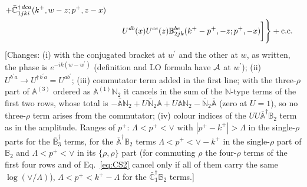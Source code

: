 \documentclass[aps,prd,amsmath,amssymb,nofootinbib]{revtex4-2}
\def\mf#1{\mathbb{#1}}
\numberwithin{equation}{section}
\begin{document}
\begin{align}
           +\bar{\mf{C}}^{\dagger\, dca}_{1jki}(k^+,w-z; p^+, z-x)  \notag \\ &\quad \quad
                 U^{db}(x)
                 U^{ce}(z) 
                {\mf{B}}^{be}_{2jk} (k^{+}-p^+, -z; p^+, -x) \bigg]  \Bigg\}+ {\rm c.c.}
\end{align} {\color{red}[Changes: (i) with the conjugated bracket at $w^\prime$ and the other at $w$, as written, the phase is $e^{-ik(w-w^\prime)}$ (definition and LO formula have ${\cal A}$ at $w^\prime$); (ii) $U^{b^\prime a}\to U^{\dagger\, b^\prime a}=U^{ab^\prime}$; (iii) commutator term added in the first line; with the three-$\rho$ part of $\mf{A}^{(3)}$ ordered as $\mf{A}^{(1)}\mf{N}_2$ it cancels in the sum of the $\mf{N}$-type terms of the first two rows, whose total is $-\bar{\mf{A}}\mf{N}_2+U\bar{\mf{N}}_2\mf{A}+U\mf{A}\mf{N}_2-\bar{\mf{N}}_2\bar{\mf{A}}$ (zero at $U=1$), so no three-$\rho$ term arises from the commutator; (iv) colour indices of the $UU\bar{\mf{A}}^\dagger\mf{B}_2$ term as in the amplitude. Ranges of $p^+$: $\Lambda<p^+<\vee$ with $|p^+-k^+|>\Lambda$ in the single-$\rho$ parts for the $\bar{\mf{B}}_3^\dagger$ terms, for the $\bar{\mf{A}}^\dagger\mf{B}_2$ terms $\Lambda<p^+<\vee-k^+$ in the single-$\rho$ part of $\mf{B}_2$ and $\Lambda<p^+<\vee$ in its $\{\rho,\rho\}$ part (for commuting $\rho$ the four-$\rho$ terms of the first four rows and of Eq.~\eqref{eq:CS2} cancel only if all of them carry the same $\log(\vee/\Lambda)$), $\Lambda<p^+<k^+-\Lambda$ for the $\bar{\mf{C}}_1^\dagger\mf{B}_2$ terms.]}\par\noindent 
\end{document}
